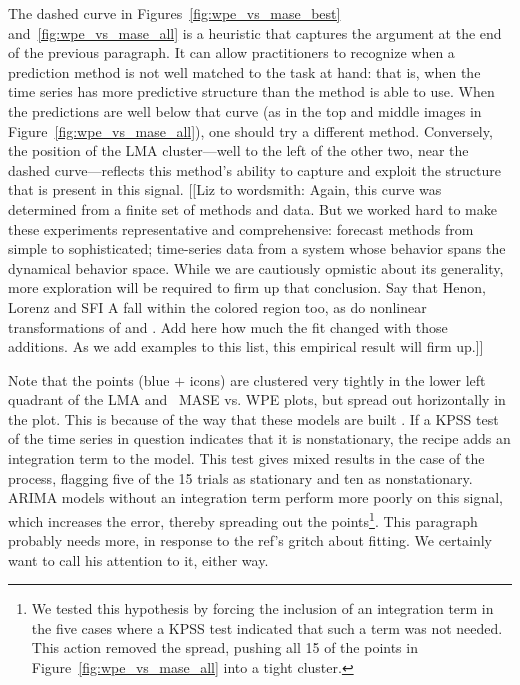 The dashed curve in Figures~\ref{fig:wpe_vs_mase_best}
and~\ref{fig:wpe_vs_mase_all} is a heuristic that captures the
argument at the end of the previous paragraph.  It can allow
practitioners to recognize when a prediction method is not well
matched to the task at hand: that is, when the time series has more
predictive structure than the method is able to use.  When the
predictions are well below that curve (as in the top and middle images
in Figure~\ref{fig:wpe_vs_mase_all}), one should try a different
method.  Conversely, the position of the LMA cluster---well to the
left of the other two, near the dashed curve---reflects this method's
ability to capture and exploit the structure that is present in this
signal.  [[Liz to wordsmith: Again, this curve was determined from a
    finite set of methods and data.  But we worked hard to make these
    experiments representative and comprehensive: forecast methods
    from simple to sophisticated; time-series data from a system whose
    behavior spans the dynamical behavior space.  While we are
    cautiously opmistic about its generality, more exploration will be
    required to firm up that conclusion.  Say that Henon, Lorenz and
    SFI A fall within the colored region too, as do nonlinear
    transformations of \svdtwo and \svdsix.  Add here how much the fit
    changed with those additions.  As we add examples to this list,
    this empirical result will firm up.]]

Note that the \col points (blue {\color{blue}$+$} icons) are clustered
very tightly in the lower left quadrant of the LMA and \naive ~MASE
vs. WPE plots, but spread out horizontally in the \arima plot.
This is because of the way that these models are built
\cite{autoARIMA}.  If a KPSS test of the time series in question
indicates that it is nonstationary, the \arima recipe adds an
integration term to the model.  This test gives mixed results in the
case of the \col process, flagging five of the 15 trials as stationary
and ten as nonstationary.  ARIMA models without an integration term
perform more poorly on this signal, which increases the error, thereby
spreading out the points\footnote{We tested this hypothesis by forcing
  the inclusion of an integration term in the five cases where a KPSS
  test indicated that such a term was not needed.  This action removed
  the spread, pushing all 15 of the \col \arima points in
  Figure~\ref{fig:wpe_vs_mase_all} into a tight cluster.}.
\alert{This paragraph probably needs more, in response to the ref's
  gritch about fitting.  We certainly want to call his attention to
  it, either way.}

